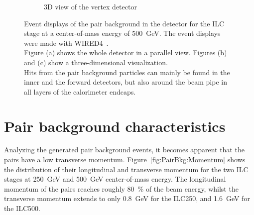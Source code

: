 \begin{figure}[h]
\begin{subfigure}[b]{0.3\textwidth}
   \caption{3D view of the vertex detector}
   \end{subfigure}
   \caption[Pair background event displays]{Event displays of the pair background in the 
   \sid detector for the ILC stage at a center-of-mass energy of \SI[detect-all]{500}{\GeV}. 
   The event displays were made with WIRED4~\cite{Wired4}.
   \\Figure (a) shows the whole \sid detector in a parallel view.
   Figures (b) and (c) show a three-dimensional visualization.
   \\Hits from the pair background particles can mainly be found in the inner and the forward detectors, but also around the beam pipe in all layers of the calorimeter endcaps.
   }
   \label{fig:PairBkg:wired4}
 \end{figure}

\section{Pair background characteristics}
\label{PairBkg:helix}
Analyzing the generated pair background events, it becomes apparent that the \positron\electron pairs have a low transverse momentum.
Figure~\ref{fig:PairBkg:Momentum} shows the distribution of their longitudinal and transverse momentum for the two ILC stages at \SI{250}{\GeV} and \SI{500}{\GeV} center-of-mass energy.
The longitudinal momentum of the \positron\electron pairs reaches roughly \SI{80}{\percent} of the beam energy, whilst the transverse momentum extends to only \SI{0.8}{\GeV} for the ILC250, and \SI{1.6}{\GeV} for the ILC500.
